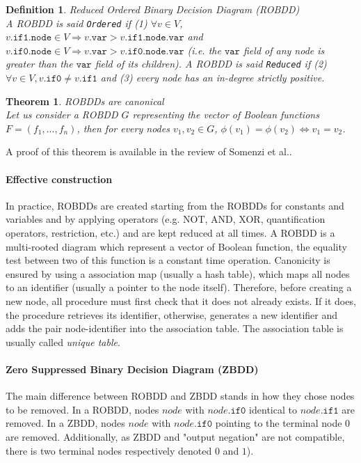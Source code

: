 \documentclass[a4paper,10pt]{article}
\newcommand{\fieldVar}{\texttt{var}}
\newcommand{\fieldNode}{\texttt{node}}
\newcommand{\fieldThen}{\mathtt{if1}}
\newcommand{\fieldElse}{\mathtt{if0}}
\newtheorem{newtheo}{Theorem}
\newcommand{\theorem}[2]{\begin{newtheo}{\textsf{#1}\\} #2 \end{newtheo}}
\newtheorem{newdef}{Definition}
\newcommand{\definition}[2]{\begin{newdef}{#1\\}#2\end{newdef}}
\begin{document}
\definition{Reduced Ordered Binary Decision Diagram (ROBDD)}
{
A ROBDD is said \texttt{Ordered} if (1) $\forall v\in V$, $v.\fieldThen{}.\fieldNode{}\in V \Rightarrow v.\fieldVar{}> v.\fieldThen{}.\fieldNode{}.\fieldVar{}$ and $v.\fieldElse{}.\fieldNode{}\in V \Rightarrow v.\fieldVar{}> v.\fieldElse{}.\fieldNode{}.\fieldVar{}$ (i.e. the $\fieldVar{}$ field of any node is greater than the $\fieldVar{}$ field of its children).
A ROBDD is said \texttt{Reduced} if (2) $\forall v\in V, v.\fieldElse{} \neq v.\fieldThen{}$ and (3) every node has an in-degree strictly positive.
}

\theorem{ROBDDs are canonical}
{
Let us consider a ROBDD $G$ representing the vector of Boolean functions $F=(f_1, ..., f_n)$, then for every nodes $v_1, v_2 \in G$, $\phi(v_1) = \phi(v_2) \Leftrightarrow v_1 = v_2$.
}
A proof of this theorem is available in the review of Somenzi et al.\cite{Somenzi1999}.

\paragraph{Effective construction\\}
In practice, ROBDDs are created starting from the ROBDDs for constants and variables and by applying operators (e.g. NOT, AND, XOR, quantification operators, restriction, etc.) and are kept reduced at all times.
A ROBDD is a multi-rooted diagram which represent a vector of Boolean function, the equality test between two of this function is a constant time operation.
Canonicity is ensured by using a association map (usually a hash table), which maps all nodes to an identifier (usually a pointer to the node itself).
Therefore, before creating a new node, all procedure must first check that it does not already exists. If it does, the procedure retrieves its identifier, otherwise, generates a new identifier and adds the pair node-identifier into the association table.
The association table is usually called \textit{unique table}.

\paragraph{Zero Suppressed Binary Decision Diagram (ZBDD)}
The main difference between ROBDD and ZBDD stands in how they chose nodes to be removed.
In a ROBDD, nodes $node$ with $node.\fieldElse{}$ identical to $node.\fieldThen{}$ are removed.
In a ZBDD, nodes $node$ with $node.\fieldElse{}$ pointing to the terminal node $0$ are removed.
Additionally, as ZBDD and "output negation" are not compatible, there is two terminal nodes respectively denoted $0$ and $1$).
\end{document}
